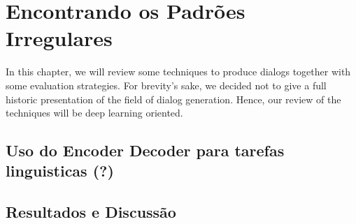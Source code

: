 \chapter{Encontrando os Padrões Irregulares}
\label{ch:03-dialog-systems}

 In this chapter, we will review some techniques to produce dialogs together with some evaluation strategies. For brevity's sake, we decided not to give a full historic presentation of the field of dialog generation. Hence, our review of the techniques will be deep learning oriented.

\section{Uso do Encoder Decoder para tarefas linguisticas (?)}
\label{ch:03-gen}

\section{Resultados e Discussão}
\label{ch:03-results}
 